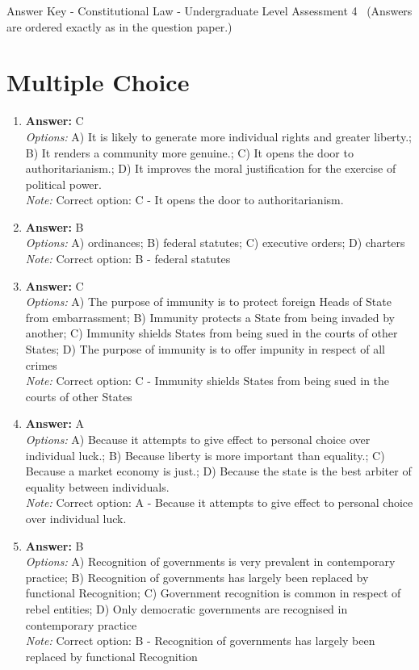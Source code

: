 \documentclass[12pt]{article}
\begin{document}
\begin{center}
Answer Key - Constitutional Law - Undergraduate Level Assessment 4 \
\small (Answers are ordered exactly as in the question paper.)
\end{center}

\section*{Multiple Choice}
\begin{enumerate}[label=\arabic*.]
\item \textbf{Answer:} C
\\ \textit{Options:} A) It is likely to generate more individual rights and greater liberty.; B) It renders a community more genuine.; C) It opens the door to authoritarianism.; D) It improves the moral justification for the exercise of political power.
\\ \textit{Note:} Correct option: C - It opens the door to authoritarianism.
\item \textbf{Answer:} B
\\ \textit{Options:} A) ordinances; B) federal statutes; C) executive orders; D) charters
\\ \textit{Note:} Correct option: B - federal statutes
\item \textbf{Answer:} C
\\ \textit{Options:} A) The purpose of immunity is to protect foreign Heads of State from embarrassment; B) Immunity protects a State from being invaded by another; C) Immunity shields States from being sued in the courts of other States; D) The purpose of immunity is to offer impunity in respect of all crimes
\\ \textit{Note:} Correct option: C - Immunity shields States from being sued in the courts of other States
\item \textbf{Answer:} A
\\ \textit{Options:} A) Because it attempts to give effect to personal choice over individual luck.; B) Because liberty is more important than equality.; C) Because a market economy is just.; D) Because the state is the best arbiter of equality between individuals.
\\ \textit{Note:} Correct option: A - Because it attempts to give effect to personal choice over individual luck.
\item \textbf{Answer:} B
\\ \textit{Options:} A) Recognition of governments is very prevalent in contemporary practice; B) Recognition of governments has largely been replaced by functional Recognition; C) Government recognition is common in respect of rebel entities; D) Only democratic governments are recognised in contemporary practice
\\ \textit{Note:} Correct option: B - Recognition of governments has largely been replaced by functional Recognition
\end{enumerate}
\end{document}
